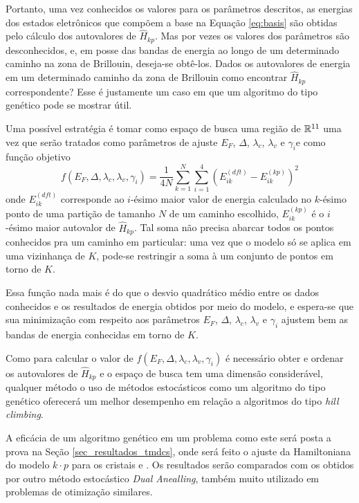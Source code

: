 Portanto, uma vez conhecidos os valores para os parâmetros descritos, as
energias dos estados eletrônicos que compõem a base na Equação \ref{eq:basis}
são obtidas pelo cálculo dos autovalores de $\hat{H}_{kp}$. Mas por vezes
os valores dos parâmetros são desconhecidos, e, em posse das bandas de energia ao
longo de um determinado caminho na zona de Brillouin, deseja-se obtê-los.
Dados os autovalores de energia em um determinado caminho da zona de Brillouin
como encontrar $\hat{H}_{kp}$ correspondente? Esse é justamente um caso em que
um algoritmo do tipo genético pode se mostrar útil.

Uma possível estratégia é tomar como espaço de busca uma região de $\mathbb{R}^{11}$
\trav uma vez que serão tratados como parâmetros de ajuste $E_F$, $\Delta$, 
$\lambda_c$, $\lambda_v$ e $\gamma_i$\trav e como função objetivo
\begin{equation}
  f(E_F, \Delta, \lambda_c, \lambda_v, \gamma_i) = 
  \frac{1}{4 N} \sum_{k=1}^N \sum_{i=1}^4 \left( E_{ik}^{(dft)} - E_{ik}^{(kp)} \right)^2
  \label{eq:tmdc_obj_function}
\end{equation}
onde $E_{ik}^{(dft)}$ corresponde ao $i$-ésimo maior valor de energia calculado no
$k$-ésimo ponto de uma partição de tamanho $N$ de um caminho escolhido,
$E_{ik}^{(kp)}$ é o $i$-ésimo maior autovalor de $\hat{H}_{kp}$. Tal soma não
precisa abarcar todos os pontos conhecidos pra um caminho em particular: uma vez
que o modelo só se aplica em uma vizinhança de $K$, pode-se restringir a soma à
um conjunto de pontos em torno de $K$.

Essa função nada mais é do que o desvio quadrático médio entre os dados
conhecidos e os resultados de energia obtidos por meio do modelo, e espera-se
que sua minimização com respeito aos parâmetros $E_F$, $\Delta$, $\lambda_c$,
$\lambda_v$ e $\gamma_i$ ajustem bem as bandas de energia conhecidas em torno de
$K$.

Como para calcular o valor de $ f(E_F, \Delta, \lambda_c, \lambda_v, \gamma_i) $
é necessário obter e ordenar os autovalores de $\hat{H}_{kp}$ e o espaço de
busca tem uma dimensão considerável, qualquer método o uso de métodos
estocásticos como um algoritmo do tipo genético oferecerá um melhor desempenho
em relação a algoritmos do tipo \textit{hill climbing}.

A eficácia de um algoritmo genético em um problema como este será posta a prova
na Seção \ref{sec_resultados_tmdcs}, onde será feito o ajuste da Hamiltoniana do
modelo $ k \cdot p $ para os cristais  e . Os resultados
serão comparados com os obtidos por outro método estocástico \textit{Dual Anealling},
também muito utilizado em problemas de otimização similares.

